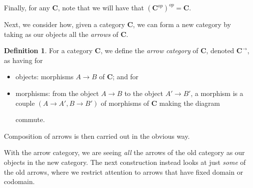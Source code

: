 \documentclass[a4paper]{book}
\theoremstyle{definition}
\theoremstyle{definition}
\newtheorem{definition}{Definition}[section]
\theoremstyle{definition}
\theoremstyle{theorem}
\theoremstyle{definition}
\begin{document}
Finally, for any $\textbf{C}$, note that we will have that $(\textbf{C}^{op})^{op} = \textbf{C}$. \par 
Next, we consider how, given a category $\textbf{C}$, we can form a new category by taking as our objects all the \textit{arrows} of $\textbf{C}$. 
	\begin{definition}
		For a category \textbf{C}, we define the \textit{arrow category}  of \textbf{C}, denoted $\textbf{C}^{\rightarrow}$, as having for 
		\begin{itemize}
			\item objects: morphisms $A \rightarrow B$ of $\textbf{C}$; and for 
			\item morphisms: from the object $A \rightarrow B$ to the object $A' \rightarrow B'$, a morphism is a couple $(A \rightarrow A', B \rightarrow B')$ of morphisms of $\textbf{C}$ making the diagram 
			\begin{center}
			\end{center}
			\par \noindent 
			commute. 
		\end{itemize}
	Composition of arrows is then carried out in the obvious way. 
	\end{definition} \noindent 
With the arrow category, we are seeing \textit{all} the arrows of the old category as our objects in the new category. The next construction instead looks at just \textit{some} of the old arrows, where we restrict attention to arrows that have fixed domain or codomain.
\end{document}
